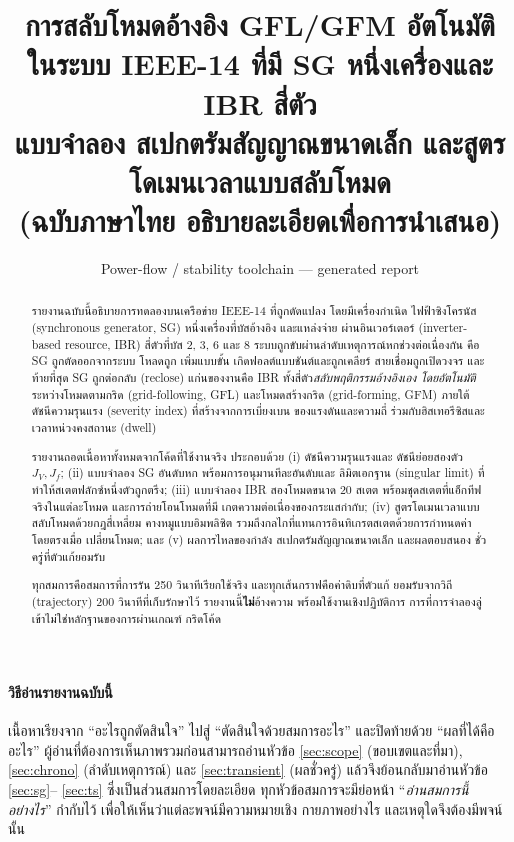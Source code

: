 \documentclass[12pt,a4paper]{article}
\title{\bfseries การสลับโหมดอ้างอิง GFL/GFM อัตโนมัติ\\
ในระบบ IEEE-14 ที่มี SG หนึ่งเครื่องและ IBR สี่ตัว\\[2pt]
\large แบบจำลอง สเปกตรัมสัญญาณขนาดเล็ก และสูตรโดเมนเวลาแบบสลับโหมด\\[2pt]
\normalsize (ฉบับภาษาไทย อธิบายละเอียดเพื่อการนำเสนอ)}
\author{Power-flow / stability toolchain --- generated report}
\date{}
\begin{document}
\maketitle
\thispagestyle{fancy}

\begin{abstract}
\noindent
รายงานฉบับนี้อธิบายการทดลองบนเครือข่าย IEEE-14 ที่ถูกดัดแปลง โดยมีเครื่องกำเนิด
ไฟฟ้าซิงโครนัส (synchronous generator, SG) หนึ่งเครื่องที่บัสอ้างอิง และแหล่งจ่าย
ผ่านอินเวอร์เตอร์ (inverter-based resource, IBR) สี่ตัวที่บัส 2, 3, 6 และ 8
ระบบถูกขับผ่านลำดับเหตุการณ์หกช่วงต่อเนื่องกัน คือ SG ถูกตัดออกจากระบบ โหลดถูก
เพิ่มแบบขั้น เกิดฟอลต์แบบชันต์และถูกเคลียร์ สายเชื่อมถูกเปิดวงจร และท้ายที่สุด SG
ถูกต่อกลับ (reclose) แก่นของงานคือ IBR ทั้งสี่ตัว\emph{สลับพฤติกรรมอ้างอิงเอง
โดยอัตโนมัติ}ระหว่างโหมดตามกริด (grid-following, GFL) และโหมดสร้างกริด
(grid-forming, GFM) ภายใต้ดัชนีความรุนแรง (severity index) ที่สร้างจากการเบี่ยงเบน
ของแรงดันและความถี่ ร่วมกับฮิสเทอรีซิสและเวลาหน่วงคงสถานะ (dwell)

รายงานถอดเนื้อหาทั้งหมดจากโค้ดที่ใช้งานจริง ประกอบด้วย (i) ดัชนีความรุนแรงและ
ดัชนีย่อยสองตัว $J_V,J_f$; (ii) แบบจำลอง SG อันดับหก พร้อมการอนุมานทีละอันดับและ
ลิมิตเอกฐาน (singular limit) ที่ทำให้สเตตฟลักซ์หนึ่งตัวถูกตรึง; (iii) แบบจำลอง IBR
สองโหมดขนาด 20 สเตต พร้อมชุดสเตตที่แอ็กทีฟจริงในแต่ละโหมด และการถ่ายโอนโหมดที่มี
เกตความต่อเนื่องของกระแสกำกับ; (iv) สูตรโดเมนเวลาแบบสลับโหมดด้วยกฎสี่เหลี่ยม
คางหมูแบบอิมพลิซิต รวมถึงกลไกที่แทนการอินทิเกรตสเตตด้วยการกำหนดค่าโดยตรงเมื่อ
เปลี่ยนโหมด; และ (v) ผลการไหลของกำลัง สเปกตรัมสัญญาณขนาดเล็ก และผลตอบสนอง
ชั่วครู่ที่ตัวแก้ยอมรับ

ทุกสมการคือสมการที่การรัน 250 วินาทีเรียกใช้จริง และทุกเส้นกราฟคือค่าดิบที่ตัวแก้
ยอมรับจากวิถี (trajectory) 200 วินาทีที่เก็บรักษาไว้ รายงานนี้\textbf{ไม่}อ้างความ
พร้อมใช้งานเชิงปฏิบัติการ การที่การจำลองลู่เข้าไม่ใช่หลักฐานของการผ่านเกณฑ์
กริดโค้ด
\end{abstract}

\paragraph{วิธีอ่านรายงานฉบับนี้}
เนื้อหาเรียงจาก ``อะไรถูกตัดสินใจ'' ไปสู่ ``ตัดสินใจด้วยสมการอะไร'' และปิดท้ายด้วย
``ผลที่ได้คืออะไร'' ผู้อ่านที่ต้องการเห็นภาพรวมก่อนสามารถอ่านหัวข้อ
\ref{sec:scope} (ขอบเขตและที่มา), \ref{sec:chrono} (ลำดับเหตุการณ์) และ
\ref{sec:transient} (ผลชั่วครู่) แล้วจึงย้อนกลับมาอ่านหัวข้อ \ref{sec:sg}--%
\ref{sec:ts} ซึ่งเป็นส่วนสมการโดยละเอียด ทุกหัวข้อสมการจะมีย่อหน้า
``\emph{อ่านสมการนี้อย่างไร}'' กำกับไว้ เพื่อให้เห็นว่าแต่ละพจน์มีความหมายเชิง
กายภาพอย่างไร และเหตุใดจึงต้องมีพจน์นั้น
\end{document}
